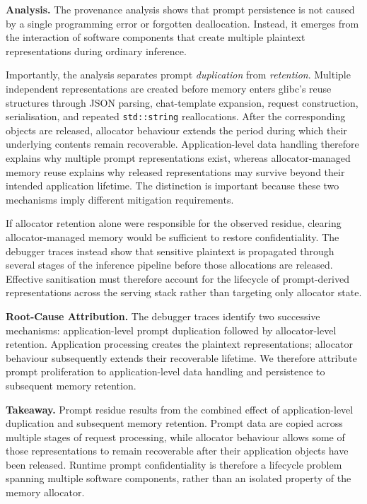 \documentclass[journal,tifs]{IEEEtran}
\begin{document}

{\bf Analysis.}
The provenance analysis shows that prompt persistence is not caused by a
single programming error or forgotten deallocation. Instead, it emerges
from the interaction of software components that create multiple
plaintext representations during ordinary inference.

Importantly, the analysis separates prompt \emph{duplication} from
\emph{retention}. Multiple independent representations are created
before memory enters glibc's reuse structures through JSON parsing,
chat-template expansion, request construction, serialisation, and
repeated \texttt{std::string} reallocations. After the corresponding
objects are released, allocator behaviour extends the period during
which their underlying contents remain recoverable. Application-level data handling therefore explains why multiple prompt
representations exist, whereas allocator-managed memory reuse explains
why released representations may survive beyond their intended
application lifetime. The distinction is important because these two
mechanisms imply different mitigation requirements.

If allocator retention alone were responsible for the observed residue,
clearing allocator-managed memory would be sufficient to restore
confidentiality. The debugger traces instead show that sensitive
plaintext is propagated through several stages of the inference
pipeline before those allocations are released. Effective sanitisation
must therefore account for the lifecycle of prompt-derived
representations across the serving stack rather than targeting only
allocator state.


{\bf Root-Cause Attribution.}
The debugger traces identify two successive mechanisms:
application-level prompt duplication followed by allocator-level
retention. Application processing creates the plaintext
representations; allocator behaviour subsequently extends their
recoverable lifetime. We therefore attribute prompt proliferation to
application-level data handling and persistence to subsequent memory
retention.


{\bf Takeaway.}
Prompt residue results from the combined effect of application-level
duplication and subsequent memory retention. Prompt data are copied
across multiple stages of request processing, while allocator behaviour
allows some of those representations to remain recoverable after their
application objects have been released. Runtime prompt confidentiality
is therefore a lifecycle problem spanning multiple software components,
rather than an isolated property of the memory allocator.
\end{document}
